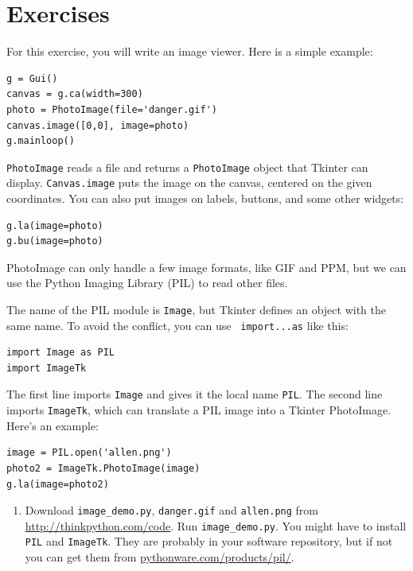 \documentclass[10pt]{book}
\begin{document}
\section{Exercises}

\begin{exercise}

For this exercise, you will write an image viewer.  Here is
a simple example:

\begin{verbatim}
g = Gui()
canvas = g.ca(width=300)
photo = PhotoImage(file='danger.gif')
canvas.image([0,0], image=photo)
g.mainloop()
\end{verbatim}
%
{\tt PhotoImage} reads a file and returns a {\tt PhotoImage} object
that Tkinter can display.  {\tt Canvas.image} puts the image on the
canvas, centered on the given coordinates.  You can also put images on
labels, buttons, and some other widgets:

\begin{verbatim}
g.la(image=photo)
g.bu(image=photo)
\end{verbatim}
%
PhotoImage can only handle a few image formats, like GIF and PPM,
but we can use the Python Imaging Library (PIL) to read other
files.

The name of the PIL module is {\tt Image}, but Tkinter defines an
object with the same name.  To avoid the conflict, you can use {\tt
  import...as} like this:

\begin{verbatim}
import Image as PIL
import ImageTk
\end{verbatim}
%
The first line imports {\tt Image} and
gives it the local name {\tt PIL}.  The second
line imports {\tt ImageTk}, which can translate a PIL
image into a Tkinter PhotoImage.  Here's an example:

\begin{verbatim}
image = PIL.open('allen.png')
photo2 = ImageTk.PhotoImage(image)
g.la(image=photo2)
\end{verbatim}
%

\begin{enumerate}

\item Download \verb"image_demo.py", \verb"danger.gif" and \verb"allen.png"
from \url{http://thinkpython.com/code}.  Run \verb"image_demo.py".  You
might have to install {\tt PIL} and {\tt ImageTk}.
They are probably in your software repository,  but if not
you can get them from \url{pythonware.com/products/pil/}.


\end{enumerate}
\end{exercise}
\end{document}
